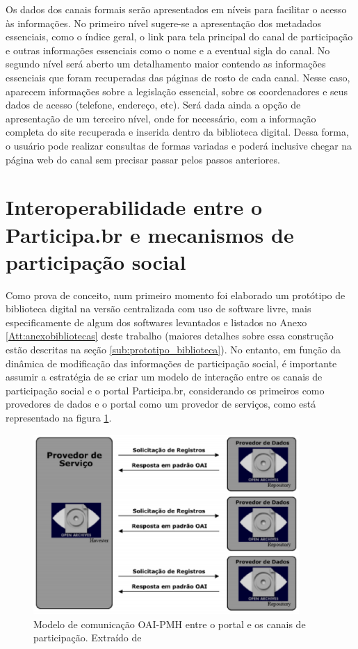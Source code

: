 Os dados dos canais formais serão apresentados em níveis para facilitar o acesso às informações. No primeiro nível sugere-se a apresentação dos metadados essenciais, como o índice geral, o link para tela principal do canal de participação e outras informações essenciais como o nome e a eventual sigla do canal. No segundo nível será aberto um detalhamento maior contendo as informações essenciais que foram recuperadas das páginas de rosto de cada canal. Nesse caso, aparecem informações sobre a legislação essencial, sobre os coordenadores e seus dados de acesso (telefone, endereço, etc). Será dada ainda a opção de apresentação de um terceiro nível, onde for necessário, com a informação completa do site recuperada e inserida dentro da biblioteca digital. Dessa forma, o usuário pode realizar consultas de formas variadas e poderá inclusive chegar na página web do canal sem precisar passar pelos passos anteriores.

\section{Interoperabilidade entre o Participa.br e mecanismos de participação social}
\label{sec:interparticipa}

Como prova de conceito, num primeiro momento foi elaborado um protótipo de biblioteca digital na versão centralizada com uso de software livre, mais especificamente de algum dos softwares levantados e listados no Anexo \ref{Att:anexobibliotecas} deste trabalho (maiores detalhes sobre essa construção estão descritas na seção \ref{sub:prototipo_biblioteca}). No entanto, em função da dinâmica de modificação das informações de participação social, é importante assumir a estratégia de se criar um modelo de interação entre os canais de participação social e o portal Participa.br, considerando os primeiros como provedores de dados e o portal como um provedor de serviços, como está representado na figura \ref{fig:modeloaipmh}.

\graphicspath{{figuras/}}
\begin{figure}[H]
\centering
\includegraphics[width=0.9\textwidth]{modelo-oaipmh}
\caption[Modelo de comunicação OAI-PMH entre o portal e os mecanismos]{Modelo de comunicação OAI-PMH entre o portal e os canais de participação. Extraído de \cite{renan2009interoperabilidade}}
\label{fig:modeloaipmh}
\end{figure}

